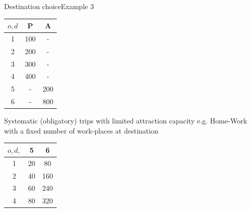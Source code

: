 \documentclass[8pt]{beamer}
\begin{document}
\begin{frame}{Destination choice}{Example 3}
\begin{center}
\begin{minipage}{0.65\textwidth}
        
    \end{minipage}\hfill
    \begin{minipage}{0.25\textwidth}
     \begin{center}
\begin{tabular}{|c|c|c|}
\hline 
{$o,d$} & P & A \\ 
\hline 
1 & 100 & -  \\ 
\hline 
2 & 200 & -  \\ 
\hline 
3 & 300 & -  \\ 
\hline 
4 & 400 & -    \\ 
\hline 
5 & - & 200  \\ 
\hline 
6 & - & 800  \\ 
\hline
\end{tabular}
\end{center}   
    \end{minipage}
\end{center}
\begin{block}{Systematic (obligatory) trips with limited attraction capacity} 
e.g. Home-Work with a fixed number of work-places at destination
\end{block}
\begin{center}
\begin{tabular}{|c|c|c|}
\hline 
{$o,d,$}& 5 & 6 \\ 
\hline 
1 & 20 & 80  \\ 
\hline 
2 & 40 & 160 \\ 
\hline 
3 & 60 & 240 \\ 
\hline 
4 & 80 & 320 \\ 
\hline 
\end{tabular} 
\end{center}
\end{frame}
\end{document}
